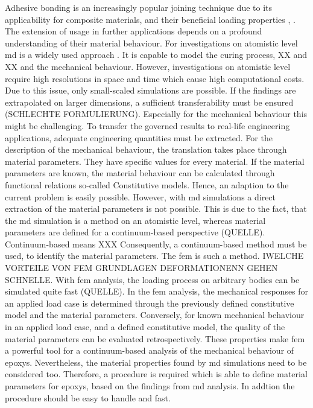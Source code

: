 Adhesive bonding is an increasingly popular joining technique due to its applicability for composite materials, and their beneficial loading properties \cite{campilho_extended_2011}, \cite{pramanik_joining_2017}. The extension of usage in further applications depends on a profound understanding of their material behaviour. For investigations on atomistic level \acrfull{md} is a widely used approach  \cite{ries_mechanical_2024}. It is capable to model the curing process, XX and XX and the mechanical behaviour. However, investigations on atomistic level require high resolutions in space and time which cause high computational costs. Due to this issue, only small-scaled simulations are possible. If the findings are extrapolated on larger dimensions, a sufficient transferability must be ensured (SCHLECHTE FORMULIERUNG). Especially for the mechanical behaviour this might be challenging. To transfer the governed results to real-life engineering applications, adequate engineering quantities must be extracted. For the description of the mechanical behaviour, the translation takes place through material parameters. They have specific values for every material. If the material parameters are known, the material behaviour can be calculated through functional relations so-called Constitutive models. Hence, an adaption to the current problem is easily possible. However, with \acrshort{md} simulations a direct extraction of the material parameters is not possible. This is due to the fact, that the \acrshort{md} simulation is a method on an atomistic level, whereas material parameters are defined for a continuum-based perspective (QUELLE). Continuum-based means XXX Consequently, a continuum-based method must be used, to identify the material parameters. The \acrfull{fem} is such a method. IWELCHE VORTEILE VON FEM GRUNDLAGEN DEFORMATIONENN GEHEN SCHNELLE. With \acrshort{fem} analysis, the loading process on arbitrary bodies can be simulated quite fast (QUELLE). In the \acrshort{fem} analysis, the mechanical responses for an applied load case is determined through the previously defined constitutive model and the material parameters. Conversely, for known mechanical behaviour in an applied load case, and a defined constitutive model, the quality of the material parameters can be evaluated retrospectively. 
These properties make \acrshort{fem} a powerful tool for a continuum-based analysis of the mechanical behaviour of epoxys. Nevertheless, the material properties found by \acrshort{md} simulations need to be considered too. Therefore, a procedure is required which is able to define material parameters for epoxys, based on the findings from \acrshort{md} analysis. In addtion the procedure should be easy to handle and fast.
